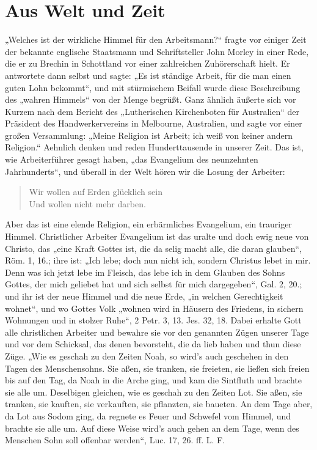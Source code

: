 \section{Aus Welt und Zeit}

„Welches ist der wirkliche Himmel für den Arbeitsmann?“ fragte vor einiger Zeit der bekannte englische Staatsmann und Schriftsteller John Morley in einer Rede, die er zu Brechin in Schottland vor einer zahlreichen Zuhörerschaft hielt. Er antwortete dann selbst und sagte: „Es ist ständige Arbeit, für die man einen guten Lohn bekommt“, und mit stürmischem Beifall wurde diese Beschreibung des „wahren Himmels“ von der Menge begrüßt. Ganz ähnlich äußerte sich vor Kurzem nach dem Bericht des „Lutherischen Kirchenboten für Australien“ der Präsident des Handwerkervereins in Melbourne, Australien, und sagte vor einer großen Versammlung: „Meine Religion ist Arbeit; ich weiß von keiner andern Religion.“ Aehnlich denken und reden Hunderttausende in unserer Zeit. Das ist, wie Arbeiterführer gesagt haben, „das Evangelium des neunzehnten Jahrhunderts“, und überall in der Welt hören wir die Losung der Arbeiter:

\begin{verse}
Wir wollen auf Erden glücklich sein\\
Und wollen nicht mehr darben.
\end{verse}

Aber das ist eine elende Religion, ein erbärmliches Evangelium, ein trauriger Himmel. Christlicher Arbeiter Evangelium ist das
uralte und doch ewig neue  von Christo, das „eine Kraft Gottes ist, die da selig macht alle, die daran glauben“, Röm. 1, 16.; ihre  ist: „Ich lebe; doch nun nicht ich, sondern Christus lebet in mir. Denn was ich jetzt lebe im Fleisch, das lebe ich in dem Glauben des Sohns Gottes, der mich geliebet hat und sich selbst für mich dargegeben“, Gal. 2, 20.; und ihr  ist der neue Himmel und die neue Erde, „in welchen Gerechtigkeit wohnet“, und wo Gottes Volk „wohnen wird in Häusern des Friedens, in sichern Wohnungen und in stolzer Ruhe“, 2 Petr. 3, 13. Jes. 32, 18. Dabei erhalte Gott alle christlichen Arbeiter und bewahre sie vor den genannten Zügen unserer Tage und vor dem Schicksal, das denen bevorsteht, die da lieb haben und thun diese Züge. „Wie es geschah zu den Zeiten Noah, so wird’s auch geschehen in den Tagen des Menschensohns. Sie aßen, sie tranken, sie freieten, sie ließen sich freien bis auf den Tag, da Noah in die Arche ging, und kam die Sintfluth und brachte sie alle um. Deselbigen gleichen, wie es geschah zu den Zeiten Lot. Sie aßen, sie tranken, sie kauften, sie verkauften, sie pflanzten, sie baueten. An dem Tage aber, da Lot aus Sodom ging, da regnete es Feuer und Schwefel vom Himmel, und brachte sie alle um. Auf diese Weise wird’s auch gehen an dem Tage, wenn des Menschen Sohn soll offenbar werden“, Luc. 17, 26. ff. L. F.
